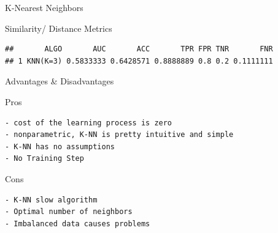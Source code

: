 \documentclass[ignorenonframetext,]{beamer}
\begin{document}
\begin{frame}[fragile]{K-Nearest Neighbors}
\begin{block}{Similarity/ Distance Metrics}
\begin{verbatim}
##       ALGO       AUC       ACC       TPR FPR TNR       FNR
## 1 KNN(K=3) 0.5833333 0.6428571 0.8888889 0.8 0.2 0.1111111
\end{verbatim}

\end{block}

\begin{block}{Advantages \& Disadvantages}

\begin{block}{Pros}

\begin{verbatim}
- cost of the learning process is zero
- nonparametric, K-NN is pretty intuitive and simple
- K-NN has no assumptions
- No Training Step
\end{verbatim}

\end{block}

\begin{block}{Cons}

\begin{verbatim}
- K-NN slow algorithm
- Optimal number of neighbors
- Imbalanced data causes problems
\end{verbatim}

\end{block}

\end{block}

\end{frame}
\end{document}
